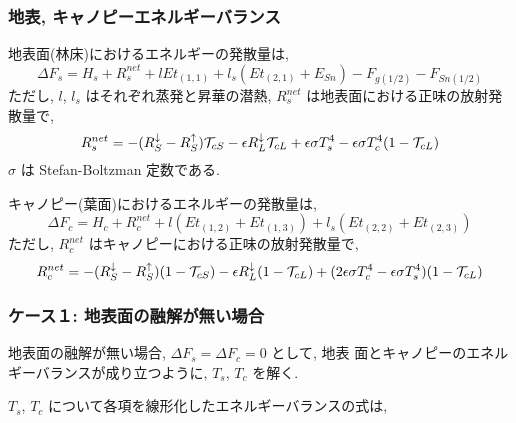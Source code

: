 \subsubsection{地表, キャノピーエネルギーバランス}

 地表面(林床)におけるエネルギーの発散量は,
 \begin{equation}
 \Delta F_s =
  H_s + R^{net}_s + l Et_{(1,1)} + l_s ( Et_{(2,1)} + E_{Sn} )
  - F_{g(1/2)} - F_{Sn(1/2)}
  \label{eb_start}
 \end{equation}
 ただし, $l$, $l_s$ はそれぞれ蒸発と昇華の潜熱,
 $R^{net}_s$ は地表面における正味の放射発散量で,
 \begin{equation}
  R^{net}_s = -(R^{\downarrow}_S - R^{\uparrow}_S) {\cal{T}}_{cS}
              - \epsilon R^{\downarrow}_L {\cal{T}}_{cL}
              + \epsilon \sigma T_s^4
              - \epsilon \sigma T_c^4 (1 - {\cal{T}}_{cL})
 \end{equation}
 $\sigma$ は Stefan-Boltzman 定数である.

 キャノピー(葉面)におけるエネルギーの発散量は,
 \begin{equation}
  \Delta F_c =
  H_c + R^{net}_c + l ( Et_{(1,2)} + Et_{(1,3)} )
  + l_s ( Et_{(2,2)} + Et_{(2,3)} )
 \end{equation}
 ただし, $R^{net}_c$ はキャノピーにおける正味の放射発散量で,
 \begin{equation}
  R^{net}_c = -(R^{\downarrow}_S - R^{\uparrow}_S) (1-{\cal{T}}_{cS})
              - \epsilon R^{\downarrow}_L (1-{\cal{T}}_{cL})
              + ( 2 \epsilon \sigma T_c^4
              - \epsilon \sigma T_s^4 ) (1 - {\cal{T}}_{cL})
  \label{eb_end}
 \end{equation}

\subsubsection{ケース１: 地表面の融解が無い場合}

地表面の融解が無い場合, $\Delta F_s=\Delta F_c=0$ として, 地表
面とキャノピーのエネルギーバランスが成り立つように, $T_s$, $T_c$ を解く.

$T_s$, $T_c$ について各項を線形化したエネルギーバランスの式は,

